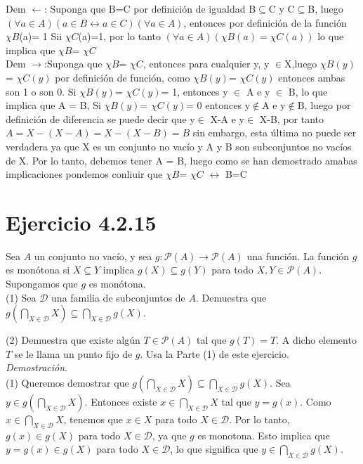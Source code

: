 \documentclass{report}
\begin{document}
    \noindent Dem $\leftarrow$: Suponga que B=C por definición de igualdad B$\subseteq$C y C$\subseteq$B, luego $(\forall a \in A)(a\in B \leftrightarrow a \in C) (\forall a \in A)$, entonces por definición de la función $\chi B$(a)= 1 Sii  $\chi C$(a)=1, por lo tanto $(\forall a \in A)(\chi B(a)= \chi C(a))$ lo que implica que $\chi B$= $\chi C$\\

    \noindent Dem $\rightarrow$:Suponga que $\chi B$= $\chi C$, entonces para cualquier y, y $\in$X,luego $\chi B(y)$= $\chi C(y)$ por definición de función, como $\chi B(y)$= $\chi C(y)$ entonces ambas son 1 o son 0. Si $\chi B(y)$= $\chi C(y)$= 1, entonces y $\in$ A e y $\in$ B, lo que implica que A = B, Si $\chi B(y)$= $\chi C(y)$= 0 entonces y$\notin$A e y$\notin$B, luego por definición de diferencia se puede decir que y$\in$ X-A e y$\in$ X-B, por tanto \\ $A=X-(X-A)=X-(X-B)=B$ sin embargo, esta última no puede ser verdadera ya que X es un conjunto no vacío y A y B son subconjuntos no vacíos de X. Por lo tanto, debemos tener A = B, luego como se han demostrado amabas implicaciones pondemos conliuir que $\chi B$= $\chi C$ $\leftrightarrow$ B=C
    \section{Ejercicio 4.2.15}

        Sea $A$ un conjunto no vacío, y sea $g: \mathscr{P}(A) \rightarrow \mathscr{P}(A)$ una función. La función $g$ es monótona si $X \subseteq Y$ implica $g(X) \subseteq g(Y)$ para todo $X, Y \in \mathscr{P}(A)$. Supongamos que $g$ es monótona.\\

        \noindent (1) Sea $\mathcal{D}$ una familia de subconjuntos de $A$. Demuestra que $g\left(\bigcap_{X \in \mathcal{D}} X\right) \subseteq \bigcap_{X \in \mathcal{D}} g(X)$.

        \noindent (2) Demuestra que existe algún $T \in \mathscr{P}(A)$ tal que $g(T)=T$. A dicho elemento $T$ se le llama un punto fijo de $g$. Usa la Parte (1) de este ejercicio.\\

        \textit{Demostración}.\\
        (1) Queremos demostrar que $g\left(\bigcap_{X \in \mathcal{D}} X\right) \subseteq \bigcap_{X \in \mathcal{D}} g(X)$.
        Sea $y \in g\left(\bigcap_{X \in \mathcal{D}} X\right)$. Entonces existe $x \in \bigcap_{X \in \mathcal{D}} X$ tal que $y=g(x)$.
        Como $x \in \bigcap_{X \in \mathcal{D}} X$, tenemos que $x \in X$ para todo $X \in \mathcal{D}$.
        Por lo tanto, $g(x) \in g(X)$ para todo $X \in \mathcal{D}$, ya que $g$ es monotona. Esto implica que $y=g(x) \in g(X)$ para todo $X \in \mathcal{D}$, lo que significa que $y \in \bigcap_{X \in \mathcal{D}} g(X)$.\\
\end{document}
